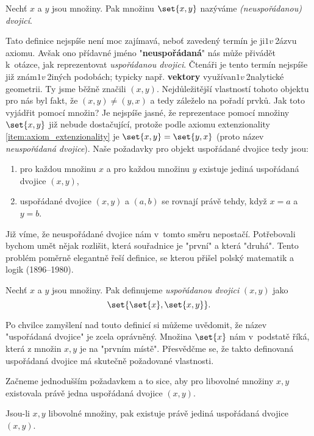 \begin{definition}
    Nechť $x$ a $y$ jsou množiny. Pak množinu $\set{x,y}$ nazýváme \emph{(neuspořádanou) dvojicí}.
\end{definition}
Tato definice nejspíše není moc zajímavá, neboť zavedený termín je ji$1 v~$2ázvu axiomu. Avšak ono přídavné jméno "\textbf{neuspořádaná}" nás může přivádět k~otázce, jak reprezentovat \emph{uspořádanou dvojici}. Čtenáři je tento termín nejspíše již znám$1 v~$2iných podobách; typicky např. \textbf{vektory} využívan$1 v~$2nalytické geometrii. Ty jsme běžně značili $(x,y)$. Nejdůležitější vlastností tohoto objektu pro nás byl fakt, že $(x,y)\neq (y,x)$ a tedy záleželo na pořadí prvků. Jak toto vyjádřit pomocí množin? Je nejspíše jasné, že reprezentace pomocí množiny $\set{x,y}$ již nebude dostačující, protože podle axiomu extenzionality \ref{item:axiom_extenzionality} je $\set{x,y}=\set{y,x}$ (proto název \emph{neuspořádaná dvojice}). Naše požadavky pro objekt uspořádané dvojice tedy jsou:
\begin{enumerate}
    \item pro každou množinu $x$ a pro každou množinu $y$ existuje jediná uspořádaná dvojice $(x,y)$,
    \item uspořádané dvojice $(x,y)$ a $(a,b)$ se rovnají právě tehdy, když $x=a$ a $y=b$.
\end{enumerate}
Již víme, že neuspořádané dvojice nám v~tomto směru nepostačí. Potřebovali bychom umět nějak rozlišit, která souřadnice je "první" a která "druhá". Tento problém poměrně elegantně řeší definice, se kterou přišel polský matematik a logik  (1896--1980).
\begin{definition}\label{def:usporadana_dvojice}
    Nechť $x$ a $y$ jsou množiny. Pak definujeme \emph{uspořádanou dvojici} $(x,y)$ jako
    \begin{equation*}
        \set{\set{x},\set{x,y}}.
    \end{equation*}
\end{definition}
Po chvilce zamyšlení nad touto definicí si můžeme uvědomit, že název "uspořádaná dvojice" je zcela oprávněný. Množina $\set{x}$ nám v~podstatě  říká, která z množin $x,y$ je na "prvním místě". Přesvědčme se, že takto definovaná uspořádaná dvojice má skutečně požadované vlastnosti.\par
Začneme jednodušším požadavkem a to sice, aby pro libovolné množiny $x,y$ existovala právě jedna uspořádaná dvojice $(x,y)$.
\begin{lemma}
    Jsou-li $x,y$ libovolné množiny, pak existuje právě jediná uspořádaná dvojice $(x,y)$.
\end{lemma}
